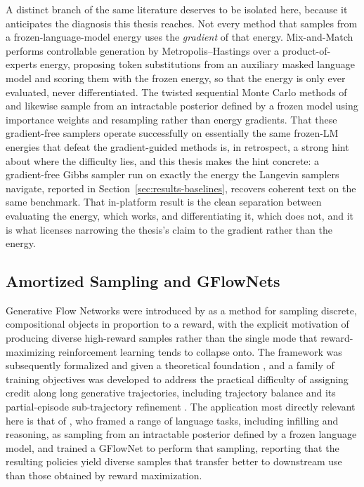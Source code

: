 A distinct branch of the same literature deserves to be isolated here, because it anticipates the diagnosis this thesis reaches. Not every method that samples from a frozen-language-model energy uses the \emph{gradient} of that energy. Mix-and-Match \citep{mireshghallah2022mixmatch} performs controllable generation by Metropolis--Hastings over a product-of-experts energy, proposing token substitutions from an auxiliary masked language model and scoring them with the frozen energy, so that the energy is only ever evaluated, never differentiated. The twisted sequential Monte Carlo methods of \citet{lew2023sequential} and \citet{zhao2024probabilistic} likewise sample from an intractable posterior defined by a frozen model using importance weights and resampling rather than energy gradients. That these gradient-free samplers operate successfully on essentially the same frozen-LM energies that defeat the gradient-guided methods is, in retrospect, a strong hint about where the difficulty lies, and this thesis makes the hint concrete: a gradient-free Gibbs sampler run on exactly the energy the Langevin samplers navigate, reported in Section~\ref{sec:results-baselines}, recovers coherent text on the same benchmark. That in-platform result is the clean separation between evaluating the energy, which works, and differentiating it, which does not, and it is what licenses narrowing the thesis's claim to the gradient rather than the energy.

\subsection{Amortized Sampling and GFlowNets}
\label{sec:rel-gflownet}

Generative Flow Networks were introduced by \citet{bengio2021flow} as a method for sampling discrete, compositional objects in proportion to a reward, with the explicit motivation of producing diverse high-reward samples rather than the single mode that reward-maximizing reinforcement learning tends to collapse onto. The framework was subsequently formalized and given a theoretical foundation \citep{bengio2023gflownet}, and a family of training objectives was developed to address the practical difficulty of assigning credit along long generative trajectories, including trajectory balance \citep{malkin2022trajectory} and its partial-episode sub-trajectory refinement \citep{madan2023learning}. The application most directly relevant here is that of \citet{hu2024amortizing}, who framed a range of language tasks, including infilling and reasoning, as sampling from an intractable posterior defined by a frozen language model, and trained a GFlowNet to perform that sampling, reporting that the resulting policies yield diverse samples that transfer better to downstream use than those obtained by reward maximization.

